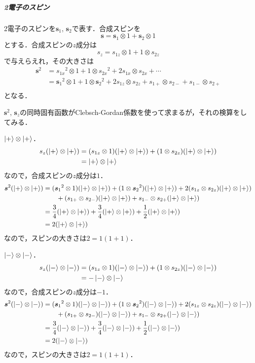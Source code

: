 \documentclass[a4paper]{ltjsreport}
\begin{document}
\subparagraph{2電子のスピン}
2電子のスピンを$\boldsymbol{s}_1$, $\boldsymbol{s}_2$で表す．合成スピンを
\[ \boldsymbol{s} = \boldsymbol{s}_1 \otimes 1 + \boldsymbol{s}_2 \otimes 1 \]
とする．合成スピンの$z$成分は
\[ s_z = s_{1z} \otimes 1 + 1 \otimes s_{2z} \]
で与えらえれ，その大きさは
\begin{align*}
  \boldsymbol{s}^2 &= s_{1x}{}^2 \otimes 1 + 1 \otimes s_{2x}{}^2 + 2 s_{1x} \otimes s_{2x} + \cdots \\
  &= \boldsymbol{s}_1{}^2 \otimes 1 + 1 \otimes \boldsymbol{s}_2{}^2 + 2 s_{1z} \otimes s_{2z} + s_{1+} \otimes s_{2-} + s_{1-} \otimes s_{2+} \\
\end{align*}
となる．

$\boldsymbol{s}^2$, $\boldsymbol{s}_z$の同時固有函数がClebsch-Gordan係数を使って求まるが，それの検算をしてみる．

$\ket{+} \otimes \ket{+}$．
\begin{align*}
  s_z(\ket{+} \otimes \ket{+}) &= (s_{1z} \otimes 1)(\ket{+} \otimes \ket{+}) + (1 \otimes s_{2z})(\ket{+} \otimes \ket{+}) \\
  &= \ket{+} \otimes \ket{+}
\end{align*}
なので，合成スピンの$z$成分は$1$．
\begin{align*}
  \boldsymbol{s}^2(\ket{+} \otimes \ket{+}) &= (\boldsymbol{s}_1{}^2 \otimes 1)(\ket{+} \otimes \ket{+}) + (1 \otimes \boldsymbol{s}_2{}^2)(\ket{+} \otimes \ket{+}) + 2 (s_{1z} \otimes s_{2z})(\ket{+} \otimes \ket{+})\\
  & \qquad + (s_{1+} \otimes s_{2-})(\ket{+} \otimes \ket{+}) + s_{1-} \otimes s_{2+}(\ket{+} \otimes \ket{+}) \\
  &= \frac{3}{4}(\ket{+} \otimes \ket{+}) + \frac{3}{4}(\ket{+} \otimes \ket{+}) + \frac{1}{2}(\ket{+} \otimes \ket{+}) \\
  &= 2 (\ket{+} \otimes \ket{+})
\end{align*}
なので，スピンの大きさは$2=1(1+1)$．

$\ket{-} \otimes \ket{-} $．
\begin{align*}
  s_z(\ket{-} \otimes \ket{-} ) &= (s_{1z} \otimes 1)(\ket{-} \otimes \ket{-} ) + (1 \otimes s_{2z})(\ket{-} \otimes \ket{-} ) \\
  &= - \ket{-} \otimes \ket{-}
\end{align*}
なので，合成スピンの$z$成分は$-1$．
\begin{align*}
  \boldsymbol{s}^2(\ket{-} \otimes \ket{-} ) &= (\boldsymbol{s}_1{}^2 \otimes 1)(\ket{-} \otimes \ket{-} ) + (1 \otimes \boldsymbol{s}_2{}^2)(\ket{-} \otimes \ket{-} ) + 2 (s_{1z} \otimes s_{2z})(\ket{-} \otimes \ket{-} )\\
  & \qquad + (s_{1+} \otimes s_{2-})(\ket{-} \otimes \ket{-} ) + s_{1-} \otimes s_{2+}(\ket{-} \otimes \ket{-} ) \\
  &= \frac{3}{4}(\ket{-} \otimes \ket{-} ) + \frac{3}{4}(\ket{-} \otimes \ket{-} ) + \frac{1}{2}(\ket{-} \otimes \ket{-} ) \\
  &= 2 (\ket{-} \otimes \ket{-} )
\end{align*}
なので，スピンの大きさは$2=1(1+1)$．
\end{document}
